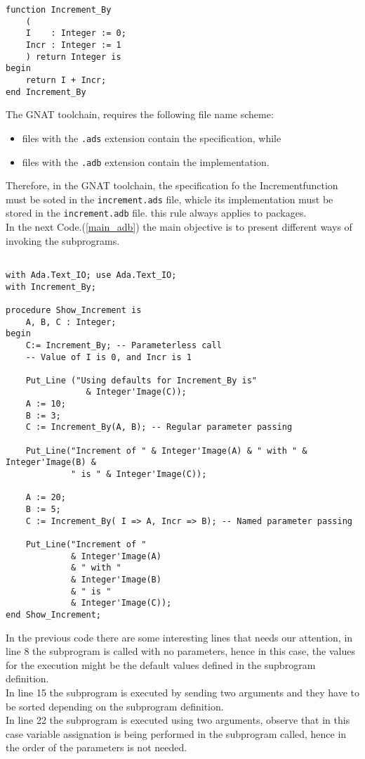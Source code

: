 \documentclass[paper=a4, fontsize=11pt]{scrartcl} %
\numberwithin{equation}{section} %
\numberwithin{figure}{section} %
\numberwithin{table}{section} %
\newcommand{\refCode}[1]{Code.(\ref{#1})}
\begin{document}
\begin{lstlisting}[caption = {increment.adb}, label = {increment_by_adb}]
function Increment_By
	(
	I    : Integer := 0;
	Incr : Integer := 1
	) return Integer is
begin 
	return I + Incr;
end Increment_By
\end{lstlisting}

The GNAT toolchain, requires the following file name scheme:
\begin{itemize}
	\item files with the \verb|.ads| extension contain the specification, while
	\item files with the \verb|.adb| extension contain the implementation.
\end{itemize}


Therefore, in the GNAT toolchain, the specification fo the Incrementfunction must be soted in the \verb|increment.ads| file, whicle its implementation must be stored in the \verb|increment.adb| file. this rule always applies to packages.\\

In the next \refCode{main_adb} the main objective is to present different ways of invoking the subprograms.

\begin{lstlisting}[caption = {main.adb}, label = {main_adb}]

with Ada.Text_IO; use Ada.Text_IO;
with Increment_By;

procedure Show_Increment is 
	A, B, C : Integer;
begin 
	C:= Increment_By; -- Parameterless call
	-- Value of I is 0, and Incr is 1

	Put_Line ("Using defaults for Increment_By is"
				& Integer'Image(C));
	A := 10;
	B := 3;
	C := Increment_By(A, B); -- Regular parameter passing

	Put_Line("Increment of " & Integer'Image(A) & " with " & Integer'Image(B) &
			 " is " & Integer'Image(C));

	A := 20;
	B := 5;
	C := Increment_By( I => A, Incr => B); -- Named parameter passing

	Put_Line("Increment of " 
			 & Integer'Image(A)
			 & " with "
			 & Integer'Image(B)
			 & " is "
			 & Integer'Image(C));
end Show_Increment;

\end{lstlisting}
In the previous code there are some interesting lines that needs our attention, in line 8 the subprogram is called with no parameters, hence in this case, the values for the execution might be the default values defined in the supbrogram definition. \\

In line 15 the subprogram is executed by sending two arguments and they have to be sorted depending on the subprogram definition. \\

In line 22 the subprogram is executed using two arguments, observe that in this case variable assignation is being performed in the subprogram called, hence in the order of the parameters is not needed. 
\end{document}
